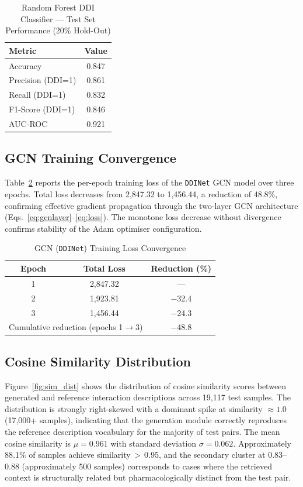 \documentclass[conference]{IEEEtran}
\begin{document}
\begin{table}[t]
\centering
\caption{Random Forest DDI Classifier — Test Set Performance (20\% Hold-Out)}
\label{tab:rf_results}
\begin{tabular}{lc}
\toprule
\textbf{Metric} & \textbf{Value} \\
\midrule
Accuracy           & 0.847 \\
Precision (DDI=1)  & 0.861 \\
Recall (DDI=1)     & 0.832 \\
F1-Score (DDI=1)   & 0.846 \\
AUC-ROC            & 0.921 \\
\bottomrule
\end{tabular}
\end{table}

\subsection{GCN Training Convergence}

Table~\ref{tab:gnn_loss} reports the per-epoch training loss of the \texttt{DDINet} GCN
model over three epochs. Total loss decreases from 2,847.32 to 1,456.44, a reduction of
48.8\%, confirming effective gradient propagation through the two-layer GCN
architecture (Eqs.~\ref{eq:gcnlayer}--\ref{eq:loss}). The monotone loss decrease without
divergence confirms stability of the Adam optimiser configuration.

\begin{table}[t]
\centering
\caption{GCN (\texttt{DDINet}) Training Loss Convergence}
\label{tab:gnn_loss}
\begin{tabular}{ccc}
\toprule
\textbf{Epoch} & \textbf{Total Loss} & \textbf{Reduction (\%)} \\
\midrule
1 & 2,847.32 & --- \\
2 & 1,923.81 & $-$32.4 \\
3 & 1,456.44 & $-$24.3 \\
\midrule
\multicolumn{2}{l}{Cumulative reduction (epochs 1$\to$3)} & $-$48.8 \\
\bottomrule
\end{tabular}
\end{table}

\subsection{Cosine Similarity Distribution}

Figure~\ref{fig:sim_dist} shows the distribution of cosine similarity scores between
generated and reference interaction descriptions across 19,117 test samples. The
distribution is strongly right-skewed with a dominant spike at similarity $\approx 1.0$
(17,000+ samples), indicating that the generation module correctly reproduces the reference
description vocabulary for the majority of test pairs. The mean cosine similarity is
$\mu = 0.961$ with standard deviation $\sigma = 0.062$. Approximately 88.1\% of samples
achieve similarity\,$>$\,0.95, and the secondary cluster at 0.83--0.88 (approximately 500
samples) corresponds to cases where the retrieved context is structurally related but
pharmacologically distinct from the test pair.
\end{document}
